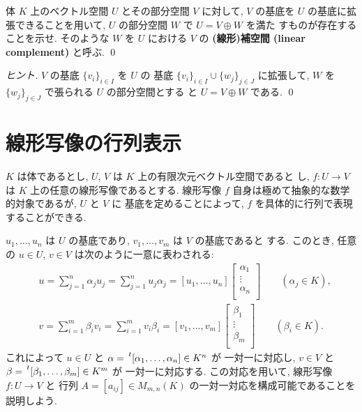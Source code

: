 \documentclass[12pt,twoside]{jarticle}
\begin{document}

\begin{question}[補空間の存在, 10点]
  \label{q:complement}
  体 $K$ 上のベクトル空間 $U$ とその部分空間 $V$ に対して, $V$ の基底を $U$ 
  の基底に拡張できることを用いて, $U$ の部分空間 $W$ で $U=V\oplus W$ を満た
  すものが存在することを示せ. 
  そのような $W$ を $U$ における $V$ の
  {\bf (線形)補空間 (linear complement)} と呼ぶ.
  \qed
\end{question}

\begin{proof}[ヒント]
  $V$ の基底 $\{v_i\}_{i\in I}$ を $U$ の
  基底 $\{v_i\}_{i\in I}\cup\{w_j\}_{j\in J}$ に拡張して,
  $W$ を $\{w_j\}_{j\in J}$ で張られる $U$ の部分空間とする
  と $U=V\oplus W$ である.
  \qed
\end{proof}


\section{線形写像の行列表示}
\label{sec:matrix-rep}

$K$ は体であるとし, $U$, $V$ は $K$ 上の有限次元ベクトル空間であると
し, $f:U\to V$ は $K$ 上の任意の線形写像であるとする. 
線形写像 $f$ 自身は極めて抽象的な数学的対象であるが, $U$ と $V$ に
基底を定めることによって, $f$ を具体的に行列で表現することができる. 

$u_1,\ldots,u_n$ は $U$ の基底であり, $v_1,\ldots,v_m$ は $V$ の基底であると
する. このとき, 任意の $u\in U$, $v\in V$ は次のように一意に表わされる:
\begin{align*}
  &
  u 
  = \sum_{j=1}^n \alpha_j u_j 
  = \sum_{j=1}^n u_j \alpha_j
  =
  [u_1,\ldots,u_n]
  \begin{bmatrix}
    \alpha_1 \\
    \vdots \\
    \alpha_n \\
  \end{bmatrix}
  \qquad (\alpha_j\in K),
  \\ &
  v
  = \sum_{i=1}^m \beta_i v_i 
  = \sum_{i=1}^m v_i \beta_i 
  =
  [v_1,\ldots,v_m]
  \begin{bmatrix}
    \beta_1 \\
    \vdots \\
    \beta_m \\
  \end{bmatrix}
  \qquad (\beta_i\in K).
\end{align*}
これによって $u\in U$ と $\alpha=\tp{[\alpha_1,\ldots,\alpha_n]}\in K^n$ が
一対一に対応し, $v\in V$ と $\beta=\tp{[\beta_1,\ldots,\beta_m]}\in K^m$ が
一対一に対応する.
この対応を用いて, 線形写像 $f:U\to V$ と
行列 $A=[a_{ij}]\in M_{m,n}(K)$ の一対一対応を構成可能であることを
説明しよう.
\end{document}
